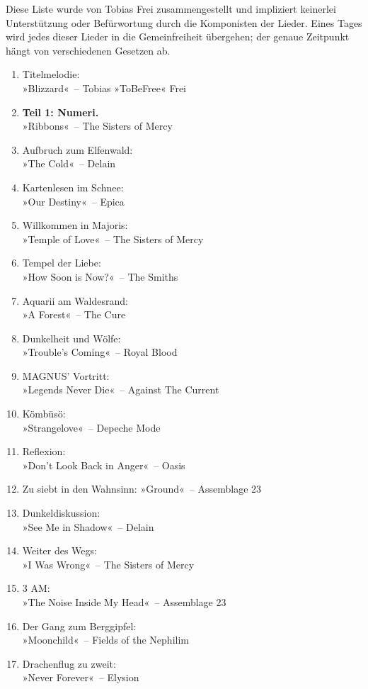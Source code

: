 Diese Liste wurde von Tobias Frei zusammengestellt und impliziert keinerlei Unterstützung oder Befürwortung durch die Komponisten der Lieder. Eines Tages wird jedes dieser Lieder in die Gemeinfreiheit übergehen; der genaue Zeitpunkt hängt von verschiedenen Gesetzen ab.

\begin{enumerate}
    \item Titelmelodie:\\ »Blizzard«~– Tobias »ToBeFree« Frei
    \item \textbf{Teil 1: Numeri.}\\ »Ribbons«~– The Sisters of Mercy
    \item Aufbruch zum Elfenwald:\\ »The Cold«~– Delain
    \item Kartenlesen im Schnee:\\ »Our Destiny«~– Epica
	\item Willkommen in Majoris:\\ »Temple of Love«~– The Sisters of Mercy
	\item Tempel der Liebe:\\ »How Soon is Now?«~– The Smiths
	\item Aquarii am Waldesrand:\\ »A Forest«~– The Cure
	\item Dunkelheit und Wölfe:\\ »Trouble’s Coming«~– Royal Blood
	\item MAGNUS’ Vortritt:\\ »Legends Never Die«~– Against The Current
    \item Kömbüsö:\\ »Strangelove«~– Depeche Mode
    \item Reflexion:\\ »Don’t Look Back in Anger«~– Oasis
	\item Zu siebt in den Wahnsinn: »Ground«~– Assemblage 23
    \item Dunkeldiskussion:\\ »See Me in Shadow«~– Delain
    \item Weiter des Wegs:\\ »I Was Wrong«~– The Sisters of Mercy
    \item 3 AM:\\ »The Noise Inside My Head«~– Assemblage 23
    \item Der Gang zum Berggipfel:\\ »Moonchild«~– Fields of the Nephilim
    \item Drachenflug zu zweit:\\ »Never Forever«~– Elysion

\end{enumerate}
